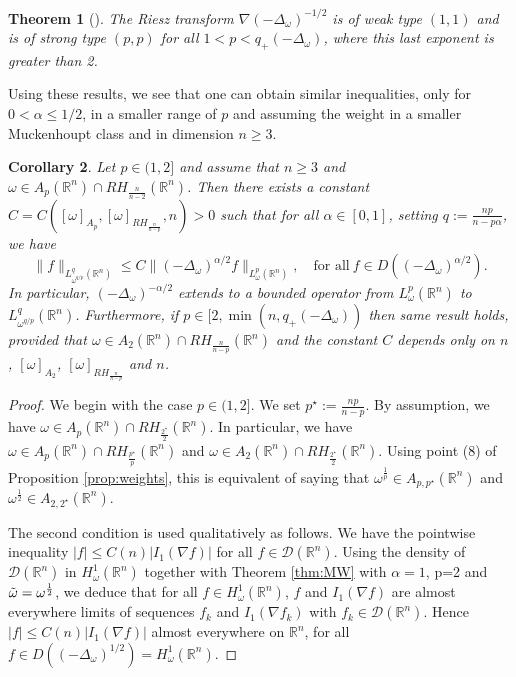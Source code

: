 \documentclass[12pt, letterpaper]{amsart}
\newtheorem{thm}{Theorem}[section]
\newtheorem{cor}[thm]{Corollary}
\theoremstyle{definition}
\theoremstyle{remark}
\numberwithin{equation}{section}
\begin{document}
{\begin{thm}[\cite{cruz2017kato}]\label{thm:TRiesz}
 The Riesz transform $\nabla (-\Delta_\omega)^{-1/2}$ is of weak type $(1,1)$  and  is of strong type $(p,p)$  for all $1< p < q_+(-\Delta_\omega)$, where this last exponent is greater than 2.
\end{thm}

Using these results, we see that one can obtain similar inequalities, only for $0<\alpha\le 1/2$, in a smaller range of $p$ and assuming the weight in a smaller Muckenhoupt class and in dimension $n\ge 3$.

\begin{cor}\label{cor:MW}
     Let $p \in (1,2]$ and assume that $n \ge 3$ and $\omega \in A_p(\mathbb{R}^n) \cap RH_{\frac{n}{n-2}}(\mathbb{R}^n)$. Then there exists a constant $C = C([\omega]_{A_p}, {[\omega]_{RH_{\frac{n}{n-p}}}}, n) > 0$ such that for all $\alpha \in [0,1]$, setting $q := \frac{np}{n - p\alpha}$, we have
    \begin{equation}\label{eq:interpolationMW}
        \| f \|_{L^{q}_{{\omega}^{q/p}}(\mathbb{R}^n)} \leq C \| (-\Delta_\omega )^{\alpha/2 } f \|_{L^p_\omega(\mathbb{R}^n)}, \quad \text{for all} \ f \in D((-\Delta_\omega)^{\alpha/2 }).
    \end{equation}
    In particular, $(-\Delta_\omega)^{-\alpha/2}$ extends to a bounded operator from $L^p_\omega(\mathbb{R}^n)$ to $L^q_{\omega^{q/p}}(\mathbb{R}^n)$. { Furthermore, if $p\in [2,\min(n,q_+(-\Delta_\omega))$ then same result holds, provided that $\omega \in A_2(\mathbb{R}^n) \cap RH_{\frac{n}{n-p}}(\mathbb{R}^n)$ and the constant $C$ depends only on $n$, $[\omega]_{A_2}$, $[\omega]_{RH_{\frac{n}{n-p}}}$ and $n$.}
\end{cor}
\begin{proof}
    {We begin with the case $p\in (1,2]$}. We set $p^\star:=\frac{np}{n-p}$. By assumption, we have $\omega \in A_p(\mathbb{R}^n) \cap RH_{\frac{2^\star}{2}}(\mathbb{R}^n)$. In particular, we have $\omega \in A_p(\mathbb{R}^n) \cap RH_{\frac{p^\star}{p}}(\mathbb{R}^n)$ and $\omega \in A_2(\mathbb{R}^n) \cap RH_{\frac{2^\star}{2}}(\mathbb{R}^n)$. Using point (8) of Proposition \ref{prop:weights}, this is equivalent of saying that $\omega^{\frac{1}{p}}\in A_{p,p^\star}(\mathbb{R}^n)$ and  $\omega^{\frac{1}{2}}\in A_{2,2^\star}(\mathbb{R}^n)$. 
    
    {The second condition is used qualitatively as follows. We have the pointwise inequality $|f|\leq C(n) |I_1(\nabla f)|$  for all $f\in \mathcal{D}(\mathbb{R}^n)$. Using the density of $\mathcal{D}(\mathbb{R}^n)$ in $H^1_\omega(\mathbb{R}^n)$ together with Theorem \ref{thm:MW} with $\alpha=1$, {p=2} and $\Tilde{\omega}=\omega^{\frac{1}{2}}$, we deduce that  {for all $f\in H^1_\omega(\mathbb{R}^n)$}, $f$ and $I_1(\nabla f)$ are almost everywhere limits of sequences $f_k$ and $I_1(\nabla f_k)$ with $f_k\in \mathcal{D}(\mathbb{R}^n)$. Hence  $|f|\leq C(n) |I_1(\nabla f)|$ almost everywhere on $\mathbb{R}^n$, for all $f\in D((-\Delta_\omega)^{1/2})=H^1_\omega(\mathbb{R}^n)$. 
   
}
\end{proof}}
\end{document}
